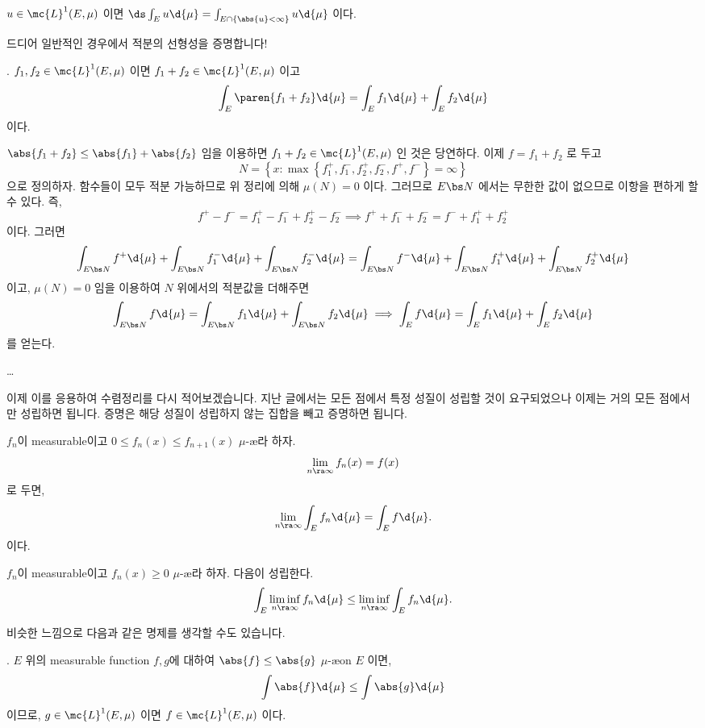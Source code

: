 \cor \(u \in \mc{L}^{1}(E, \mu)\) 이면 \(\ds \int_E u \d{\mu} = \int_{E \cap \{\abs{u} < \infty\}} u \d{\mu}\) 이다.

드디어 일반적인 경우에서 적분의 선형성을 증명합니다!

\thm. \(f_1, f_2 \in \mc{L}^{1}(E, \mu)\) 이면 \(f_1 + f_2 \in \mc{L}^{1}(E, \mu)\) 이고
\[
    \int_E \paren{f_1 + f_2} \d{\mu} = \int_E f_1 \d{\mu} + \int_E f_2 \d{\mu}
\]
이다.

\pf \(\abs{f_1 + f_2} \leq \abs{f_1} + \abs{f_2}\) 임을 이용하면 \(f_1+f_2 \in \mc{L}^{1}(E, \mu)\) 인 것은 당연하다. 이제 \(f = f_1 + f_2\) 로 두고
\[
    N = \left\{x : \max\left\{f_1^+, f_1^-, f_2^+, f_2^-, f^+, f^-\right\} = \infty \right\}
\]
으로 정의하자. 함수들이 모두 적분 가능하므로 위 정리에 의해 \(\mu(N) = 0\) 이다. 그러므로 \(E \bs N\) 에서는 무한한 값이 없으므로 이항을 편하게 할 수 있다. 즉,
\[
    f^+ - f^- = f_1^+ - f_1^- + f_2^+ - f_2^- \implies f^+ + f_1^- + f_2^- = f^- + f_1^+ + f_2^+
\]
이다. 그러면
\[
    \int_{E\bs N} f^+ \d{\mu} + \int_{E\bs N} f_1^- \d{\mu} + \int_{E\bs N} f_2^- \d{\mu} = \int_{E\bs N} f^-\d{\mu} + \int_{E\bs N} f_1^+\d{\mu} + \int_{E\bs N} f_2^+ \d{\mu}
\]
이고, \(\mu(N) = 0\) 임을 이용하여 \(N\) 위에서의 적분값을 더해주면
\[
    \int_{E \bs N} f \d{\mu} = \int_{E \bs N} f_1 \d{\mu} + \int_{E \bs N} f_2 \d{\mu} \implies \int_{E} f \d{\mu} = \int_{E} f_1 \d{\mu} + \int_{E} f_2 \d{\mu}
\]
를 얻는다.

\dots

이제 이를 응용하여 수렴정리를 다시 적어보겠습니다. 지난 글에서는 모든 점에서 특정 성질이 성립할 것이 요구되었으나 이제는 거의 모든 점에서만 성립하면 됩니다. 증명은 해당 성질이 성립하지 않는 집합을 빼고 증명하면 됩니다.

  \(f_n\)이 measurable이고 \(0 \leq f_n(x) \leq f_{n+1}(x)\) \(\mu\)-\ae 라 하자.
\[
    \lim_{n\ra\infty} f_n(x) = f(x)
\]
로 두면,
\[
    \lim_{n \ra \infty} \int_E f_n \d{\mu} = \int_E f \d{\mu}.
\]
이다.

  \(f_n\)이 measurable이고 \(f_n(x) \geq 0\) \(\mu\)-\ae 라 하자. 다음이 성립한다.
\[
    \int_E \liminf_{n\ra\infty} f_n \d{\mu} \leq \liminf_{n\ra\infty} \int_E f_n \d{\mu}.
\]

비슷한 느낌으로 다음과 같은 명제를 생각할 수도 있습니다.

\prop. \(E\) 위의 measurable function \(f, g\)에 대하여 \(\abs{f} \leq \abs{g}\) \(\mu\)-\ae on \(E\) 이면,
\[
    \int \abs{f} \d{\mu} \leq \int \abs{g} \d{\mu}
\]
이므로, \(g \in \mc{L}^{1}(E, \mu)\) 이면 \(f \in \mc{L}^{1}(E, \mu)\) 이다.

